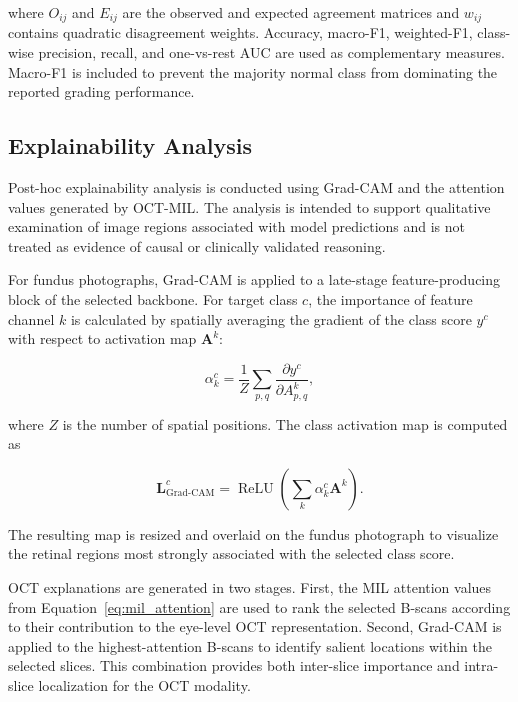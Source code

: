 \documentclass[preprint,12pt]{elsarticle}
\begin{document}
where $O_{ij}$ and $E_{ij}$ are the observed and expected agreement matrices and $w_{ij}$ contains quadratic disagreement weights. Accuracy, macro-F1, weighted-F1, class-wise precision, recall, and one-vs-rest AUC are used as complementary measures. Macro-F1 is included to prevent the majority normal class from dominating the reported grading performance.

\subsection{Explainability Analysis}
\label{subsec:explainability}

Post-hoc explainability analysis is conducted using Grad-CAM and the attention values generated by OCT-MIL. The analysis is intended to support qualitative examination of image regions associated with model predictions and is not treated as evidence of causal or clinically validated reasoning.

For fundus photographs, Grad-CAM is applied to a late-stage feature-producing block of the selected backbone. For target class $c$, the importance of feature channel $k$ is calculated by spatially averaging the gradient of the class score $y^{c}$ with respect to activation map $\mathbf{A}^{k}$:

\begin{equation}
    \alpha_{k}^{c}
    =
    \frac{1}{Z}
    \sum_{p,q}
    \frac{\partial y^{c}}
    {\partial A_{p,q}^{k}},
    \label{eq:gradcam_weights}
\end{equation}

where $Z$ is the number of spatial positions. The class activation map is computed as

\begin{equation}
    \mathbf{L}_{\mathrm{Grad\text{-}CAM}}^{c}
    =
    \operatorname{ReLU}
    \left(
    \sum_{k}
    \alpha_{k}^{c}\mathbf{A}^{k}
    \right).
    \label{eq:gradcam_map}
\end{equation}

The resulting map is resized and overlaid on the fundus photograph to visualize the retinal regions most strongly associated with the selected class score.

OCT explanations are generated in two stages. First, the MIL attention values from Equation~\eqref{eq:mil_attention} are used to rank the selected B-scans according to their contribution to the eye-level OCT representation. Second, Grad-CAM is applied to the highest-attention B-scans to identify salient locations within the selected slices. This combination provides both inter-slice importance and intra-slice localization for the OCT modality.
\end{document}
